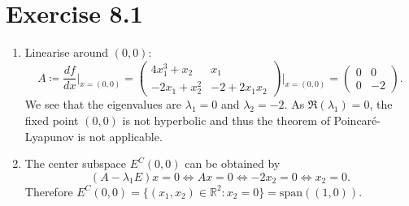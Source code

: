 \documentclass[a4paper,DIV=1]{article}
\theoremstyle{plain}
\begin{document}
\section*{Exercise 8.1 }
\begin{enumerate}[label=(\alph*)]
	\item Linearise around $(0,0)$:
	\[
		A \coloneqq \frac{df}{dx} \Big \vert_{x=(0,0)} = \begin{pmatrix}
			4x_1^3+x_2 & x_1 \\ -2x_1+x_2^2 & -2+2x_1x_2
		\end{pmatrix} \Bigg\vert_{x=(0,0)} = \begin{pmatrix}
		 0 & 0 \\ 0 & -2
		\end{pmatrix}.
	\]
	We see that the eigenvalues are $\lambda_1 = 0$ and $\lambda_2 = -2$. As $\Re(\lambda_1)=0$, the fixed point $(0,0)$ is not hyperbolic and thus the theorem of Poincaré-Lyapunov is not applicable.
	
	\item The center subspace $E^C(0,0)$ can be obtained by 
	\[
		(A-\lambda_1E)x = 0 \iff Ax = 0 \iff -2x_2 = 0 \iff x_2 = 0.
	\]
	Therefore $E^C(0,0) = \{ (x_1,x_2)  \in \mathbb R^2 : x_2 = 0 \} = \mathrm{span}((1,0))$.
	

\end{enumerate}
\end{document}

